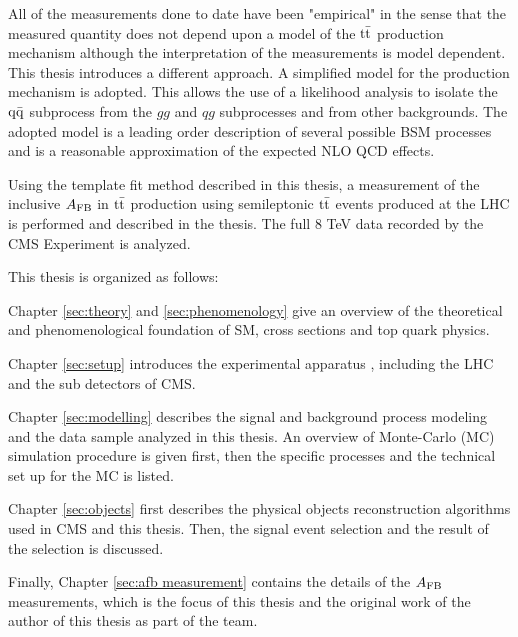 All of the measurements done to date have been "empirical" in the sense that the measured quantity does not depend upon a model of the $\mathrm{t}\bar{\mathrm{t}}$ production mechanism although the interpretation of the measurements is model dependent. This thesis introduces a different approach. A simplified model for the production mechanism is adopted. This allows the use of a likelihood analysis to isolate the $\mathrm{q \bar{q}}$ subprocess from the $gg$  and $qg$ subprocesses and from other backgrounds.  The adopted model is a leading order description of several possible BSM processes and is a reasonable approximation of the expected NLO QCD effects.

Using the template fit method described in this thesis, a measurement of the inclusive $A_{\mathrm{FB}}$ in $\mathrm{t}\bar{\mathrm{t}}$ production using semileptonic $\mathrm{t}\bar{\mathrm{t}}$ events produced at the LHC is performed and described in the thesis. The full 8 TeV data recorded by the CMS Experiment is analyzed. 
 

This thesis is organized as follows:

Chapter \ref{sec:theory} and \ref{sec:phenomenology} give an overview of the theoretical and phenomenological foundation of SM, cross sections and top quark physics.

Chapter \ref{sec:setup} introduces the experimental apparatus , including the LHC and the sub detectors of CMS. 

Chapter \ref{sec:modelling} describes the signal and background process modeling and the data sample analyzed in this thesis. An overview of Monte-Carlo (MC) simulation procedure is given first, then the specific processes and the technical set up for the MC is listed. 

Chapter \ref{sec:objects} first describes the physical objects reconstruction algorithms used in CMS and this thesis. Then, the signal event selection and the result of the selection is discussed.

Finally, Chapter \ref{sec:afb measurement} contains the details of the $A_{\mathrm{FB}}$ measurements, which is the focus of this thesis and the original work of the author of this thesis as part of the team.